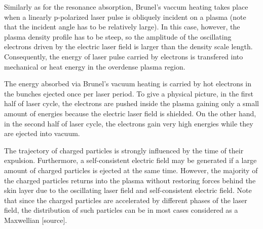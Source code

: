 Similarly as for the resonance absorption, Brunel's vaccum heating takes place when a linearly p-polarized laser pulse is obliquely incident on a plasma (note that the incident angle has to be relatively large). In this case, however, the plasma density profile has to be steep, so the amplitude of the oscillating electrons driven by the electric laser field is larger than the density scale length. Consequently, the energy of laser pulse carried by electrons is transfered into mechanical or heat energy in the overdense plasma region.

The energy absorbed via Brunel's vacuum heating is carried by hot electrons in the bunches
ejected once per laser period. To give a physical picture, in the first half of laser cycle, the electrons are pushed inside the plasma gaining only a small amount of energies because the electric laser field is shielded. On the other hand, in the second half of laser cycle, the electrons gain very high energies while they are ejected into vacuum.

The trajectory of charged particles is strongly influenced by the time of their expulsion. Furthermore, a self-consistent electric field may be generated if a large amount of charged particles is ejected at the same time. However, the majority of the charged particles returns into the plasma without restoring forces behind the skin layer due to the oscillating laser field and self-consistent electric field. Note that since the charged particles are accelerated by different phases of the laser field, the distribution of such particles can be in most cases considered as a Maxwellian [source].